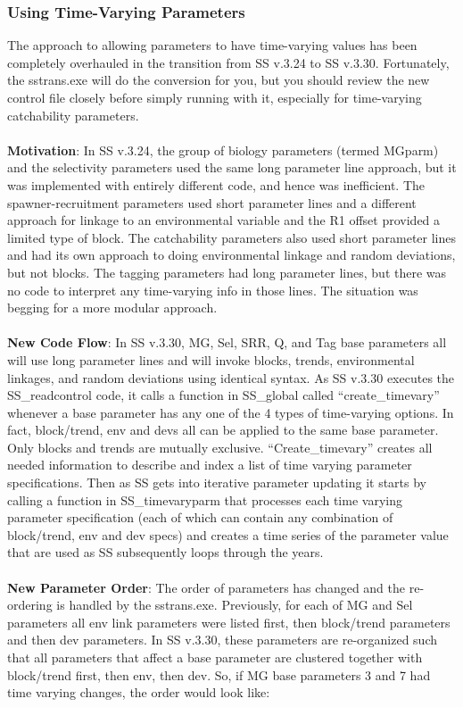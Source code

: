 \hypertarget{TVpara}{}
\hypertarget{time-vary}{}
\subsubsection{Using Time-Varying Parameters}
 The approach to allowing parameters to have time-varying values has been completely overhauled in the transition from SS v.3.24 to SS v.3.30.  Fortunately, the sstrans.exe will do the conversion for you, but you should review the new control file closely before simply running with it, especially for time-varying catchability parameters.
 \\\\
 \noindent \textbf{Motivation}:  In SS v.3.24, the group of biology parameters (termed MGparm) and the selectivity parameters used the same long parameter line approach, but it was implemented with entirely different code, and hence was inefficient.  The spawner-recruitment parameters used short parameter lines and a different approach for linkage to an environmental variable and the R1 offset provided a limited type of block.  The catchability parameters also used short parameter lines and had its own approach to doing environmental linkage and random deviations, but not blocks.  The tagging parameters had long parameter lines, but there was no code to interpret any time-varying info in those lines.  The situation was begging for a more modular approach.
 \\\\
 \noindent \textbf{New Code Flow}:  In SS v.3.30, MG, Sel, SRR, Q, and Tag base parameters all will use long parameter lines and will invoke blocks, trends, environmental linkages, and random deviations using identical syntax.   As SS v.3.30 executes the SS\_readcontrol code, it calls a function in SS\_global called “create\_timevary” whenever a base parameter has any one of the 4 types of time-varying options.  In fact, block/trend, env and devs all can be applied to the same base parameter.  Only blocks and trends are mutually exclusive.  “Create\_timevary” creates all needed information to describe and index a list of time varying parameter specifications.  Then as SS gets into iterative parameter updating it starts by calling a function in SS\_timevaryparm that processes each time varying parameter specification (each of which can contain any combination of block/trend, env and dev specs) and creates a time series of the parameter value that are used as SS subsequently loops through the years.
 \\\\
 \noindent \textbf{New Parameter Order}: The order of parameters has changed and the re-ordering is handled by the sstrans.exe.  Previously, for each of MG and Sel parameters all env link parameters were listed first, then block/trend parameters and then dev parameters.  In SS v.3.30, these parameters are re-organized such that all parameters that affect a base parameter are clustered together with block/trend first, then env, then dev.  So, if MG base parameters 3 and 7 had time varying changes, the order would look like:
 

